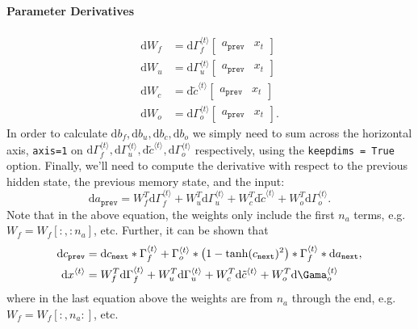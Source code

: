 \documentclass[12pt]{article}
\newcommand{\D}{\mathrm{d}}
\begin{document}
\paragraph{Parameter Derivatives}
\begin{align*}
  \D W_f &= \D \Gamma_f^{\langle t \rangle} \begin{bmatrix}  a_{\texttt{prev}} &     x_t   \end{bmatrix} \\
  \D W_u &= \D \Gamma_u^{\langle t \rangle} \begin{bmatrix}a_{\texttt{prev}} &     x_t     \end{bmatrix} \\
  \D W_c &= \D \tilde c^{\langle t \rangle} \begin{bmatrix} a_{\texttt{prev}} & x_t
\end{bmatrix} \\
  \D W_o &= \D \Gamma_o^{\langle t \rangle} \begin{bmatrix} a_{\texttt{prev}} & x_t
  \end{bmatrix}.
\end{align*}
In order to calculate $\D b_f, \D b_u, \D b_c, \D b_o$ we simply need to sum across the horizontal axis, \texttt{axis=1} on $\D \Gamma_f^{\langle t \rangle}, \D \Gamma_u^{\langle t \rangle}, \D \tilde c^{\langle t \rangle}, \D \Gamma_o^{\langle t \rangle}$ respectively, using the \texttt{keepdims = True} option.
Finally, we'll need to compute the derivative with respect to the previous hidden state, the previous memory state, and the input:
\[
  \D a_{\texttt{prev}} = W_f^T \D \Gamma_f^{\langle t \rangle} + W_u^T \D \Gamma_u^{\langle t \rangle} + W_c^T \D \tilde c^{\langle t \rangle} + W_o^T \D \Gamma_o^{\langle t \rangle}.
\]
Note that in the above equation, the weights only include the first $n_a$ terms, e.g. $W_f = W_f[:,:n_a]$, etc. Further, it can be shown that
\begin{align*}
  \D c_{\texttt{prev}} &= \D c_{\texttt{next}} * \Gamma_f^{\langle t \rangle} + \Gamma_o^{\langle t \rangle} * \left(1 - \tanh(c_{\texttt{next}})^2\right) *                          \Gamma_f^{\langle t \rangle} * \D a_{\texttt{next}}, \\
  \D x^{\langle t \rangle} &= W_f^T \D \Gamma_f^{\langle t \rangle} + W_u^T \D \Gamma_u^{\langle t \rangle} + W_c^T\D \tilde c^{\langle t \rangle} + W_o^T \D \Gama_o^{\langle t \rangle}
\end{align*}
where in the last equation above the weights are from $n_a$ through the end, e.g. $W_f = W_f[:, n_a:]$, etc.
\end{document}

